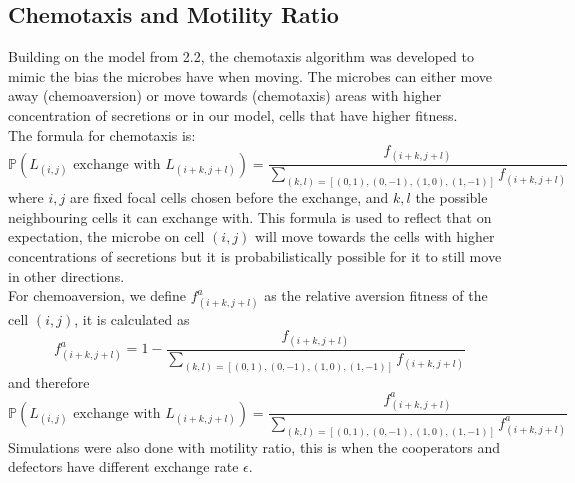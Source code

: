 \documentclass[11pt]{article}
\begin{document}
\subsection{Chemotaxis and Motility Ratio}
Building on the model from 2.2, the chemotaxis algorithm was developed to mimic the bias the microbes have when moving. The microbes can either move away (chemoaversion) or move towards (chemotaxis) areas with higher concentration of secretions or in our model, cells that have higher fitness.\\
The formula for chemotaxis is:\[\mathds{P}(\text{$L_{(i,j)}$ exchange with $L_{(i+k,j+l)}$})=\frac{f_{(i+k,j+l)}}{\sum_{(k,l)=[(0,1),(0,-1),(1,0),(1,-1)]} f_{(i+k,j+l)}}\]
where $i, j$ are fixed focal cells chosen before the exchange, and $k,l$ the possible neighbouring cells it can exchange with. This formula is used to reflect that on expectation, the microbe on cell $(i,j)$ will move towards the cells with higher concentrations of secretions but it is probabilistically possible for it to still move in other directions.\\
For chemoaversion, we define $f^a_{(i+k,j+l)}$ as the relative aversion fitness of the cell $(i,j)$, it is calculated as \[f^a_{(i+k,j+l)}=1-\frac{f_{(i+k,j+l)}}{\sum_{(k,l)=[(0,1),(0,-1),(1,0),(1,-1)]} f_{(i+k,j+l)}} \]
and therefore
\[\mathds{P}(\text{$L_{(i,j)}$ exchange with $L_{(i+k,j+l)}$})=\frac{f^a_{(i+k,j+l)}}{\sum_{(k,l)=[(0,1),(0,-1),(1,0),(1,-1)]} f^a_{(i+k,j+l)}}\]
Simulations were also done with motility ratio, this is when the cooperators and defectors have different exchange rate $\epsilon$.\\
\end{document}
